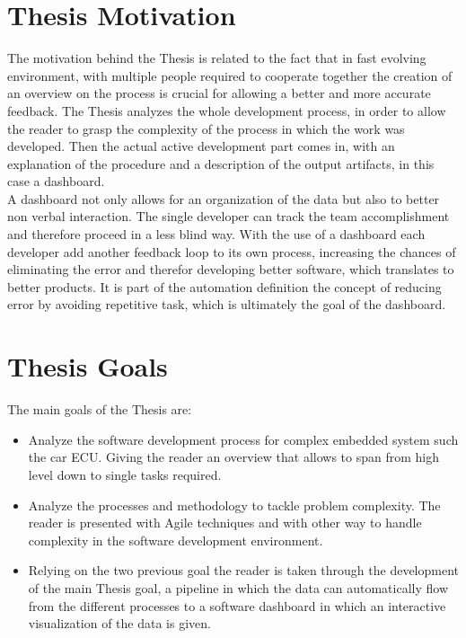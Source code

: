 \documentclass[../main.tex]{subfiles}
\begin{document}
\section{Thesis Motivation}
The motivation behind the Thesis is related to the fact that in fast evolving environment, with multiple people required to cooperate together the creation of an overview on the process is crucial for allowing a better and more accurate feedback. 
The Thesis analyzes the whole development process, in order to allow the reader to grasp the complexity of the process in which the work was developed. Then the actual active development part comes in, with an explanation of the procedure and a description of the output artifacts, in this case a dashboard.\\
A dashboard not only allows for an organization of the data but also to better non verbal interaction. The single developer can track the team accomplishment and therefore proceed in a less blind way. With the use of a dashboard each developer add another feedback loop to its own process, increasing the chances of eliminating the error and therefor developing better software, which translates to better products. It is part of the automation definition the concept of reducing error by avoiding repetitive task, which is ultimately the goal of the dashboard. 
\section{Thesis Goals}
The main goals of the Thesis are:
\begin{itemize}
    \item Analyze the software development process for complex embedded system such the car \gls{ECU}. Giving the reader an overview that allows to span from high level down to single tasks required. 
    \item Analyze the processes and methodology to tackle problem complexity. The reader is presented with Agile techniques and with other way to handle complexity in the software development environment.
    \item Relying on the two previous goal the reader is taken through the development of the main Thesis goal, a pipeline in which the data can automatically flow from the different processes to a software dashboard in which an interactive visualization of the data is given. 
\end{itemize}
\cleardoublepage
\end{document}
